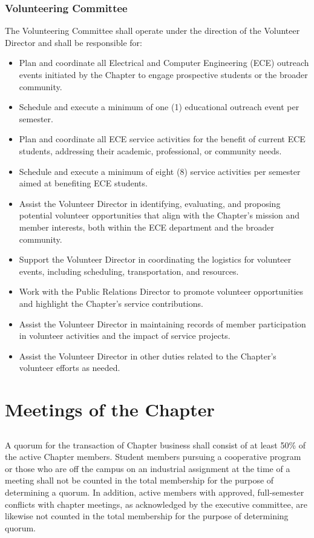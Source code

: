 \documentclass[10pt, oneside]{article}
\begin{document}
\subsubsection{Volunteering Committee}
The Volunteering Committee shall operate under the direction of the Volunteer Director and shall be responsible for:
\begin{itemize}
    \item Plan and coordinate all Electrical and Computer Engineering (ECE) outreach events initiated by the Chapter to engage prospective students or the broader community.
    \item Schedule and execute a minimum of one (1) educational outreach event per semester.
    \item Plan and coordinate all ECE service activities for the benefit of current ECE students, addressing their academic, professional, or community needs.
    \item Schedule and execute a minimum of eight (8) service activities per semester aimed at benefiting ECE students.
    \item Assist the Volunteer Director in identifying, evaluating, and proposing potential volunteer opportunities that align with the Chapter's mission and member interests, both within the ECE department and the broader community.
    \item Support the Volunteer Director in coordinating the logistics for volunteer events, including scheduling, transportation, and resources.
    \item Work with the Public Relations Director to promote volunteer opportunities and highlight the Chapter's service contributions.
    \item Assist the Volunteer Director in maintaining records of member participation in volunteer activities and the impact of service projects.
    \item Assist the Volunteer Director in other duties related to the Chapter's volunteer efforts as needed.
\end{itemize}

\section{Meetings of the Chapter}
\subsection{}
A quorum for the transaction of Chapter business shall consist of at least 50\% of the active Chapter members. Student members pursuing a cooperative program or those who are off the campus on an industrial assignment at the time of a meeting shall not be counted in the total membership for the purpose of determining a quorum. In addition, active members with approved, full-semester conflicts with chapter meetings, as acknowledged by the executive committee, are likewise not counted in the total membership for the purpose of determining quorum.
\end{document}
